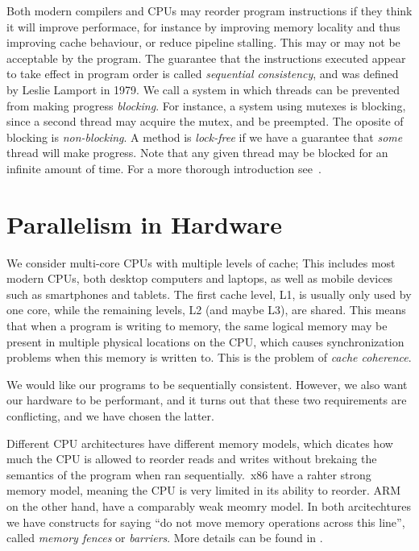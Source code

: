 \documentclass[b5paper,twoside]{report}
\begin{document}
Both modern compilers and CPUs may reorder program instructions
if they think it will improve performace, for instance by
improving memory locality and thus improving cache behaviour,
or reduce pipeline stalling. This may or may not be acceptable by
the program. The guarantee that the instructions executed
appear to take effect in program order is called
\emph{sequential consistency}, and was defined by Leslie Lamport
in 1979.
We call a system in which threads can be prevented from making
progress \emph{blocking}. For instance, a system using mutexes
is blocking, since a second thread may acquire the mutex,
and be preempted. The oposite of blocking is \emph{non-blocking}.
A method is \emph{lock-free} if we have a guarantee that
\emph{some} thread will make progress.
Note that any given thread may be blocked for an infinite amount of time.
For a more thorough introduction see~\cite{herlihy2011art}.





\section{Parallelism in Hardware}
We consider multi-core CPUs with multiple levels of cache;
This includes most modern CPUs, both desktop computers and laptops,
as well as mobile devices such as smartphones and tablets.
The first cache level, L1, is usually only used by one core,
while the remaining levels, L2 (and maybe L3), are shared.
This means that when a program is writing to memory,
the same logical memory may be present in multiple
physical locations on the CPU, which causes synchronization
problems when this memory is written to. This is the
problem of \emph{cache coherence}.

We would like our programs to be sequentially consistent.
However, we also want our hardware to be performant, and it
turns out that these two requirements are conflicting, and we have
chosen the latter.

Different CPU architectures have different memory models,
which dicates how much the CPU is allowed to reorder reads and
writes without brekaing the semantics of the program when ran
sequentially.\
x86 have a rahter strong memory model, meaning the CPU is very limited
in its ability to reorder. ARM on the other hand, have a comparably weak
meomry model.
In both arcitechtures we have constructs for saying ``do not move
memory operations across this line'', called \emph{memory fences} or
\emph{barriers}. More details can be found in .
\end{document}
